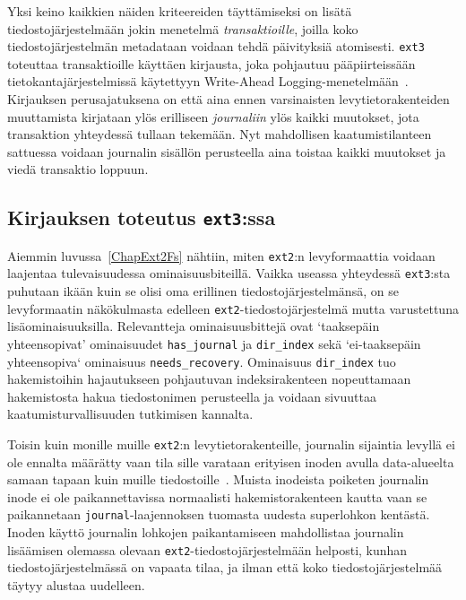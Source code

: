 Yksi keino kaikkien näiden kriteereiden täyttämiseksi on lisätä tiedostojärjestelmään jokin menetelmä \emph{transaktioille},
joilla koko tiedostojärjestelmän metadataan voidaan tehdä päivityksiä atomisesti.
\texttt{ext3} toteuttaa transaktioille käyttäen kirjausta,
joka pohjautuu pääpiirteissään tietokantajärjestelmissä käytettyyn Write-Ahead Logging-menetelmään~\cite{AriesWal}.
Kirjauksen perusajatuksena on että aina ennen varsinaisten levytietorakenteiden muuttamista kirjataan ylös erilliseen \emph{journaliin} ylös kaikki muutokset,
jota transaktion yhteydessä tullaan tekemään.
Nyt mahdollisen kaatumistilanteen sattuessa voidaan journalin sisällön perusteella aina toistaa kaikki muutokset ja viedä transaktio loppuun.

%

\subsection{Kirjauksen toteutus \texttt{ext3}:ssa}
Aiemmin luvussa~\ref{ChapExt2Fs} nähtiin,
miten \texttt{ext2}:n levyformaattia voidaan laajentaa tulevaisuudessa ominaisuusbiteillä.
Vaikka useassa yhteydessä \texttt{ext3}:sta puhutaan ikään kuin se olisi oma erillinen tiedostojärjestelmänsä,
on se levyformaatin näkökulmasta edelleen \texttt{ext2}-tiedostojärjestelmä mutta varustettuna lisäominaisuuksilla.
Relevantteja ominaisuusbittejä ovat `taaksepäin yhteensopivat' ominaisuudet \texttt{has\_journal} ja \texttt{dir\_index} sekä `ei-taaksepäin yhteensopiva` ominaisuus \texttt{needs\_recovery}.
Ominaisuus \texttt{dir\_index} tuo hakemistoihin hajautukseen pohjautuvan indeksirakenteen nopeuttamaan hakemistosta hakua tiedostonimen perusteella ja voidaan sivuuttaa kaatumisturvallisuuden tutkimisen kannalta.

Toisin kuin monille muille \texttt{ext2}:n levytietorakenteille, journalin sijaintia levyllä ei ole ennalta määrätty vaan tila sille varataan erityisen inoden avulla data-alueelta samaan tapaan kuin muille tiedostoille~\cite{Ext2Journal}.
Muista inodeista poiketen journalin inode ei ole paikannettavissa normaalisti hakemistorakenteen kautta vaan se paikannetaan \texttt{journal}-laajennoksen tuomasta uudesta superlohkon kentästä.
Inoden käyttö journalin lohkojen paikantamiseen mahdollistaa journalin lisäämisen olemassa olevaan \texttt{ext2}-tiedostojärjestelmään helposti,
kunhan tiedostojärjestelmässä on vapaata tilaa,
ja ilman että koko tiedostojärjestelmää täytyy alustaa uudelleen.

